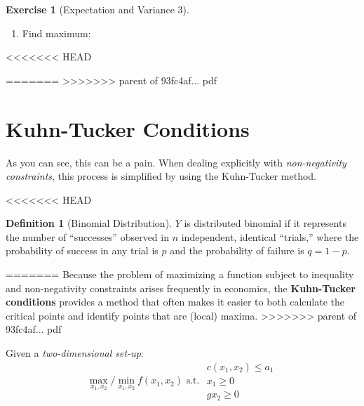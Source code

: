 \documentclass[]{book}
\providecommand{\tightlist}{%
  \setlength{\itemsep}{0pt}\setlength{\parskip}{0pt}}
\theoremstyle{definition}
\newtheorem{definition}{Definition}[chapter]
\theoremstyle{definition}
\theoremstyle{definition}
\newtheorem{exercise}{Exercise}[chapter]
\theoremstyle{remark}
\begin{document}
\begin{exercise}[Expectation and Variance 3]

\begin{enumerate}
\def\labelenumi{\arabic{enumi}.}
\setcounter{enumi}{4}
\tightlist
\item
  Find maximum: \phantom{Looking at the values of $f(x_1,x_2)$ at the critical points, we see that the constrained maximum is located at $(x_1, x_2) = (0,0)$, which is the same as the unconstrained max.  The constrained minimum is located at $(x_1, x_2) = (0,4)$, while there is no unconstrained minimum for this problem.}
\end{enumerate}
<<<<<<< HEAD
\end{exercise}
=======
>>>>>>> parent of 93fc4af... pdf

\hypertarget{kuhn-tucker-conditions}{%
\section{Kuhn-Tucker Conditions}\label{kuhn-tucker-conditions}}

As you can see, this can be a pain. When dealing explicitly with \emph{non-negativity constraints}, this process is simplified by using the Kuhn-Tucker method.

<<<<<<< HEAD
\begin{definition}[Binomial Distribution]
\protect\hypertarget{def:unnamed-chunk-87}{}{\label{def:unnamed-chunk-87} {} }\(Y\) is distributed binomial if it represents the number of ``successes'' observed in \(n\) independent, identical ``trials,'' where the probability of success in any trial is \(p\) and the probability of failure is \(q=1-p\).
\end{definition}
=======
Because the problem of maximizing a function subject to inequality and non-negativity constraints arises frequently in economics, the \textbf{Kuhn-Tucker conditions} provides a method that often makes it easier to both calculate the critical points and identify points that are (local) maxima.
>>>>>>> parent of 93fc4af... pdf

Given a \emph{two-dimensional set-up}:
\[\max_{x_1,x_2}/\min_{x_1,x_2} f(x_1,x_2) \text{ s.t. }
\begin{array}{l}
c(x_1,x_2) \le a_1\\
x_1 \ge 0 \\
gx_2 \ge 0
\end{array}\]
\end{document}
